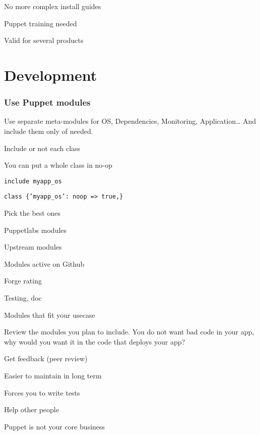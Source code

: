 \begin{iframe}
\item No more complex install guides
\item Puppet training needed
\item Valid for several products
\end{iframe}
\section{Development}
\begin{frame}
    \frametitle{Use Puppet modules}
    \huge Use separate meta-modules for OS, Dependencies, Monitoring, Application\dots{} And include them only of needed.
\end{frame}

\begin{iframe}
\item Include or not each class
\item You can put a whole class in no-op
\item{\texttt{include myapp\_os}}
\item{\texttt{class \{'myapp\_os': noop => true,\}}}
\end{iframe}


\begin{iframe}
\item Pick the best ones
\item Puppetlabs modules
\item Upstream modules
\item Modules active on Github
\item Forge rating
\item Testing, doc
\item Modules that fit your usecase
\end{iframe}

\begin{frame}\LARGE Review the modules you plan to include. You do not want bad code in your app, why would you want it in the code that deploys your app?\end{frame}

\begin{iframe}
\item Get feedback (peer review)
\item Easier to maintain in long term
\item Forces you to write tests
\item Help other people
\item Puppet is not your core business
\end{iframe}


